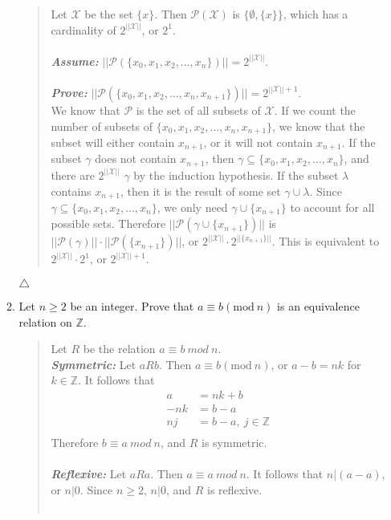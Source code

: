 \documentclass{article}
\newcommand{\ZZ}{\mathbb{Z}}
\begin{document}
\begin{enumerate}
\begin{enumerate}
\begin{quote}
Let $\mathcal{X}$ be the set $\{x\}$.
Then $\mathcal{P}(\mathcal{X})$ is $\{\emptyset,\{x\}\}$, which has a cardinality of $2^{||\mathcal{X}||}$, or $2 ^{1}$.\\\\
\textit{\textbf{Assume:}} $||\mathcal{P}(\{x_{0}, x_{1}, x_{2}, \ldots, x_{n}\})|| = 2^{||\mathcal{X}||}$. \\\\
\textit{\textbf{Prove:}} $||\mathcal{P}(\{x_{0}, x_{1}, x_{2}, \ldots,x_{n}, x_{n+1}\})|| = 2^{||\mathcal{X}|| + 1}$.\\
We know that $\mathcal{P}$ is the set of all subsets of $\mathcal{X}$.
If we count the number of subsets of $\{x_{0}, x_{1}, x_{2},\ldots,x_{n},x_{n+1}\}$, we know that the subset will either contain $x_{n+1}$, or it will not contain $x_{n+1}$.
If the subset $\gamma$ does not contain $x_{n+1}$, then $\gamma \subseteq \{x_{0},x_{1},x_{2},\ldots,x_{n}\}$, and there are $2^{||\mathcal{X}||}$ $\gamma$ by the induction hypothesis.
If the subset $\lambda$ contains $x_{n+1}$, then it is the result of some set $\gamma \cup \lambda$.
Since $\gamma \subseteq\{x_{0},x_{1},x_{2},\ldots,x_{n}\}$, we only need $\gamma \cup \{x_{n+1}\}$ to account for all possible sets.
Therefore $||\mathcal{P}(\gamma \cup \{x_{n+1}\})||$ is $||\mathcal{P}(\gamma)|| \cdot ||\mathcal{P}(\{x_{n+1}\})||$, or $2^{||\mathcal{X}||} \cdot 2^{||\{x_{n+1}\}||}$.
This is equivalent to $2^{||\mathcal{X}||}\cdot2^{1}$, or $2^{||\mathcal{X}|| + 1}$.
\end{quote}
$\triangle$
\item Let $n \geq 2$ be an integer.
Prove that $a \equiv b(\text{mod}\ n)$ is an equivalence relation on $\ZZ$.
\begin{quote}
Let $R$ be the relation $a\equiv b\ mod\ n$.\\
\textit{\textbf{Symmetric:}} Let $aRb$.
Then $a \equiv b(\text{mod}\ n)$, or $a - b = nk$ for $k\in\ZZ$.
It follows that
\begin{align*}
a &= nk + b\\
-nk &= b-a\\
nj &= b-a,\ j\in\ZZ\\
\end{align*}
Therefore $b \equiv a\ mod\ n$, and $R$ is symmetric.\\\\
\textit{\textbf{Reflexive:}} Let $aRa$.
Then $a \equiv a\ mod\ n$.
It follows that $n|(a-a)$, or $n|0$.
Since $n \geq 2$, $n|0$, and $R$ is reflexive.\\\\

\end{quote}
\end{enumerate}
\end{enumerate}
\end{document}
